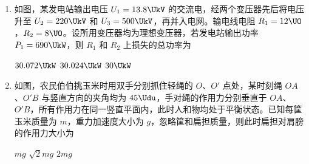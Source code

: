 \documentclass[\gkver]{gaokaozhenti}
\begin{document}
\begin{enumerate}
{对所有电子，竖直方向加速度和位移均相同，根据 $y=\frac{1}{2}at^{2}$ 可知，运动时间相同。

水平方向做匀速运动，则落在 M 的电子初速度较小，即 $E_{k1}<E_{k2}$。

对光电效应过程，根据爱因斯坦光电效应方程 $E_{k}=h\nu-W_{0}$，可知 $\nu_{1}<\nu_{2}$。

故选 A。
}
\item
如图，某发电站输出电压 $U_{1}=13.8\UkV$ 的交流电，经两个变压器先后将电压升至 $U_{2}=220\UkV$ 和 $U_{3}=500\UkV$，再并入电网。输电线电阻 $R_{1}=12\UO$，$R_{2}=8\UO$。设所用变压器均为理想变压器，若发电站输出功率 $P_{1}=690\UkW$，则 $R_{1}$ 和 $R_{2}$ 上损失的总功率为 

\fourchoices[answer=B]
{$30.118\UkW$}
{$30.072\UkW$}
{$30.024\UkW$}
{$30\UkW$}


\item
如图，农民伯伯挑玉米时用双手分别抓住轻绳的 $O$、$O'$ 点处，某时刻绳 $OA$、$O'B$ 与竖直方向的夹角均为 $45\Udu$，手对绳的作用力分别垂直于 $OA$、$O'B$，所有作用力在同一竖直平面内，此时人和物均处于平衡状态。已知每筐玉米质量为 $m$，重力加速度大小为 $g$，忽略筐和扁担质量，则此时扁担对肩膀的作用力大小为 

{$mg$}
{$\sqrt{2}mg$}
{$2mg$}


\end{enumerate}
\end{document}
